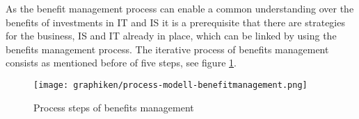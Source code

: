 \label{process_benefits_management}

As the benefit management process can enable a common understanding over the benefits of investments in IT and IS it is a prerequisite that there are strategies for the business, IS and IT already in place, which can be linked by using the benefits management process.\citep[p.21]{ward_benefits_2012} The iterative process of benefits management consists as mentioned before of five steps, see figure \ref{process_model_benefitmanagement}. 

\begin{figure}[h]
\centering
\texttt{[image: graphiken/process-modell-benefitmanagement.png]}%
\caption{Process steps of benefits management \citep[p.442]{ward2002}}%
\label{process_model_benefitmanagement}%
\end{figure} 

